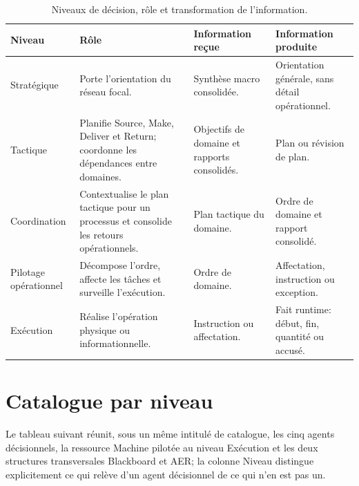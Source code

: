 \begin{table}[H]
  \centering
  \small
  \begin{tabularx}{\textwidth}{L{0.16\textwidth} L{0.20\textwidth} Y Y}
    \toprule
    Niveau & Rôle & Information reçue & Information produite \\
    \midrule
    Stratégique & Porte l'orientation du réseau focal. & Synthèse macro consolidée. & Orientation générale, sans détail opérationnel. \\
    Tactique & Planifie Source, Make, Deliver et Return; coordonne les dépendances entre domaines. & Objectifs de domaine et rapports consolidés. & Plan ou révision de plan. \\
    Coordination & Contextualise le plan tactique pour un processus et consolide les retours opérationnels. & Plan tactique du domaine. & Ordre de domaine et rapport consolidé. \\
    Pilotage opérationnel & Décompose l'ordre, affecte les tâches et surveille l'exécution. & Ordre de domaine. & Affectation, instruction ou exception. \\
    Exécution & Réalise l'opération physique ou informationnelle. & Instruction ou affectation. & Fait runtime: début, fin, quantité ou accusé. \\
    \bottomrule
  \end{tabularx}
  \caption{Niveaux de décision, rôle et transformation de l'information.}
  \label{tab:niveaux-agents-annexe}
\end{table}

\section{Catalogue par niveau}

Le tableau suivant réunit, sous un même intitulé de catalogue, les cinq agents décisionnels, la ressource Machine pilotée au niveau Exécution et les deux structures transversales Blackboard et AER; la colonne Niveau distingue explicitement ce qui relève d'un agent décisionnel de ce qui n'en est pas un.

